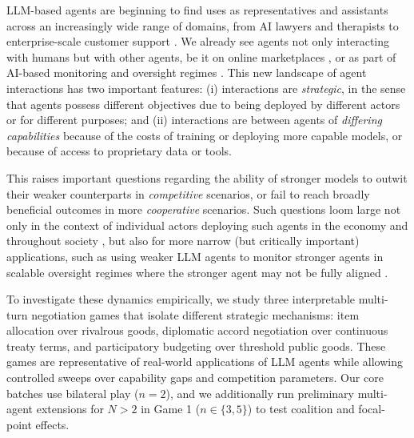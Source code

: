 LLM-based agents are beginning to find uses as representatives and assistants across an increasingly wide range of domains, from AI lawyers and therapists to enterprise-scale customer support \citep{DoNotPay,PsychiatryMentalHealth,Sierra}.
We already see agents not only interacting with humans \citep{ProjectVend} but with other agents, be it on online marketplaces \citep{MetaBusinessAI}, or as part of AI-based monitoring and oversight regimes \citep{baker2025monitoring}.
This new landscape of agent interactions has two important features: (i) interactions are \emph{strategic}, in the sense that agents possess different objectives due to being deployed by different actors or for different purposes; and (ii) interactions are between agents of \emph{differing capabilities} because of the costs of training or deploying more capable models, or because of access to proprietary data or tools.

This raises important questions regarding the ability of stronger models to outwit their weaker counterparts in \emph{competitive} scenarios, or fail to reach broadly beneficial outcomes in more \emph{cooperative} scenarios.
Such questions loom large not only in the context of individual actors deploying such agents in the economy and throughout society \citep{Dafoe2020,Hammond2025a,Sharp2025}, but also for more narrow (but critically important) applications, such as using weaker LLM agents to monitor stronger agents in scalable oversight regimes where the stronger agent may not be fully aligned \citep{Amodei2016,Christiano2018a,Kenton2024}.

To investigate these dynamics empirically, we study three interpretable multi-turn negotiation games that isolate different strategic mechanisms: item allocation over rivalrous goods, diplomatic accord negotiation over continuous treaty terms, and participatory budgeting over threshold public goods. These games are representative of real-world applications of LLM agents \citep{Pactum2025} while allowing controlled sweeps over capability gaps and competition parameters. Our core batches use bilateral play ($n=2$), and we additionally run preliminary multi-agent extensions for $N > 2$ in Game 1 ($n \in \{3,5\}$) to test coalition and focal-point effects.


